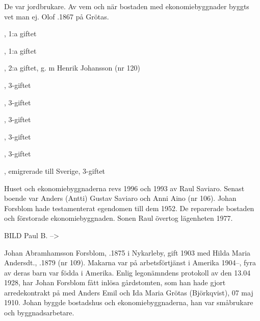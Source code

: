 De var jordbrukare. Av vem och när bostaden med ekonomiebyggnader byggts vet man ej. Olof .1867 på Grötas.
\begin{jhchildren}
  \item {}, 1:a giftet
  \item {}, 1:a giftet
  \item {}, 2:a giftet, g. m Henrik Johansson (nr 120)
  \item {}, 3-giftet
  \item {}, 3-giftet
  \item {}, 3-giftet
  \item {}, 3-giftet
  \item {}, 3-giftet
  \item {}, emigrerade till Sverige, 3-giftet
\end{jhchildren}




Huset och ekonomiebyggnaderna revs 1996 och 1993 av Raul Saviaro. Senast boende var Anders (Antti) Gustav Saviaro och Anni Aino (nr 106). Johan Forsblom hade testamenterat egendomen till dem 1952. De reparerade bostaden och förstorade ekonomiebyggnaden. Sonen Raul övertog lägenheten 1977.

BILD Paul B. -->

Johan Abramhamsson Forsblom, .1875 i Nykarleby, gift 1903 med Hilda Maria Andersdt., .1879 (nr 109).  Makarna var på arbetsförtjänst i Amerika 1904--, fyra av deras barn var födda i Amerika. Enlig legonämndens protokoll av den 13.04 1928, har Johan Forsblom fått inlösa gårdstomten, som han hade gjort arredekontrakt  på  med Anders Emil och Ida Maria Grötas (Björkqvist), 07 maj 1910. Johan byggde bostadshus och ekonomiebyggnaderna, han var småbrukare och byggnadsarbetare.
\begin{jhchildren}
  \item {}
  \item {}
  \item {}
  \item {}
  \item {}
\end{jhchildren}

